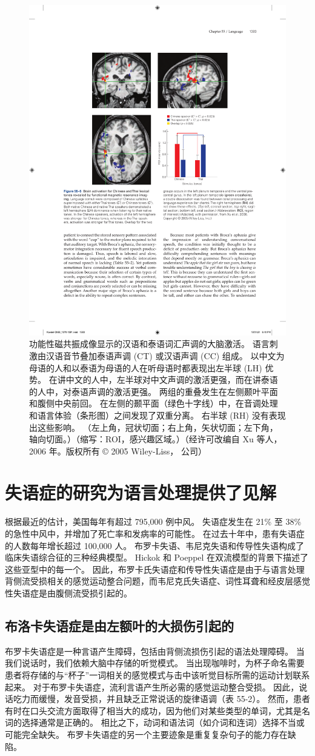 \begin{figure}[htbp]
	\centering
	\includegraphics[width=0.65\linewidth]{chap55/fig_55_5}
	\caption{功能性磁共振成像显示的汉语和泰语词汇声调的大脑激活。 语言刺激由汉语音节叠加泰语声调 (CT) 或汉语声调 (CC) 组成。 以中文为母语的人和以泰语为母语的人在听母语时都表现出左半球 (LH) 优势。 在讲中文的人中，左半球对中文声调的激活更强，而在讲泰语的人中，对泰语声调的激活更强。 两组的重叠发生在左侧颞叶平面和腹侧中央前回。 在左侧的颞平面（绿色十字线）中，在音调处理和语言体验（条形图）之间发现了双重分离。 右半球 (RH) 没有表现出这些影响。 （左上角，冠状切面；右上角，矢状切面；左下角，轴向切面。）（缩写：ROI，感兴趣区域。）（经许可改编自 Xu 等人，2006 年。版权所有 © 2005 Wiley-Liss， 公司）}
	\label{fig:55_5}
\end{figure}


\section{失语症的研究为语言处理提供了见解}
根据最近的估计，美国每年有超过 795,000 例中风。 失语症发生在 21\% 至 38\% 的急性中风中，并增加了死亡率和发病率的可能性。 在过去十年中，患有失语症的人数每年增长超过 100,000 人。 布罗卡失语、韦尼克失语和传导性失语构成了临床失语综合征的三种经典模型。 Hickok 和 Poeppel 在双流模型的背景下描述了这些亚型中的每一个。 因此，布罗卡氏失语症和传导性失语症是由于与语言处理背侧流受损相关的感觉运动整合问题，而韦尼克氏失语症、词性耳聋和经皮层感觉性失语症是由腹侧流受损引起的。

\subsection{布洛卡失语症是由左额叶的大损伤引起的}
布罗卡失语症是一种言语产生障碍，包括由背侧流损伤引起的语法处理障碍。 当我们说话时，我们依赖大脑中存储的听觉模式。 当出现咖啡时，为杯子命名需要患者将存储的与“杯子”一词相关的感觉模式与击中该听觉目标所需的运动计划联系起来。 对于布罗卡失语症，流利言语产生所必需的感觉运动整合受损。 因此，说话吃力而缓慢，发音受损，并且缺乏正常说话的旋律语调（表 55-2）。 然而，患者有时在口头交流方面取得了相当大的成功，因为他们对某些类型的单词，尤其是名词的选择通常是正确的。 相比之下，动词和语法词（如介词和连词）选择不当或可能完全缺失。 布罗卡失语症的另一个主要迹象是重复复杂句子的能力存在缺陷。

